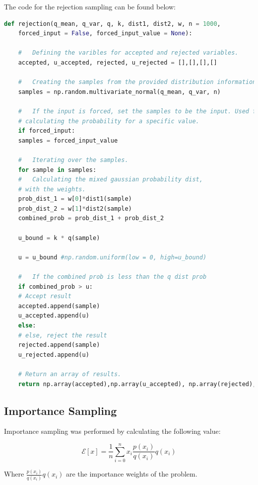\documentclass[a4paper, 11pt]{article}
\begin{document}
The code for the rejection sampling can be found below:
\begin{lstlisting}[language=Python, caption=Rejection Sampling Code.]
def rejection(q_mean, q_var, q, k, dist1, dist2, w, n = 1000, 
    forced_input = False, forced_input_value = None):

    #   Defining the varibles for accepted and rejected variables.
    accepted, u_accepted, rejected, u_rejected = [],[],[],[] 

    #   Creating the samples from the provided distribution information.
    samples = np.random.multivariate_normal(q_mean, q_var, n)

    #   If the input is forced, set the samples to be the input. Used for 
    # calculating the probability for a specific value.
    if forced_input:
    samples = forced_input_value

    #   Iterating over the samples.
    for sample in samples:
    #   Calculating the mixed gaussian probability dist,
    # with the weights.
    prob_dist_1 = w[0]*dist1(sample)
    prob_dist_2 = w[1]*dist2(sample)
    combined_prob = prob_dist_1 + prob_dist_2

    u_bound = k * q(sample)

    u = u_bound #np.random.uniform(low = 0, high=u_bound)

    #   If the combined prob is less than the q dist prob
    if combined_prob > u:
    # Accept result
    accepted.append(sample)
    u_accepted.append(u)
    else:
    # else, reject the result
    rejected.append(sample)
    u_rejected.append(u)

    # Return an array of results.
    return np.array(accepted),np.array(u_accepted), np.array(rejected), np.array(u_rejected)
\end{lstlisting}

\subsection*{Importance Sampling}

Importance sampling was performed by calculating the following value:

\begin{equation}\label{eq:importance}
        \mathcal{E}[x] = \frac{1}{n} \sum_{i=0}^n x_i \frac{p(x_i)}{q(x_i)} q(x_i)
\end{equation}

Where $\frac{p(x_i)}{q(x_i)} q(x_i)$ are the importance weights of the problem. 
\end{document}
